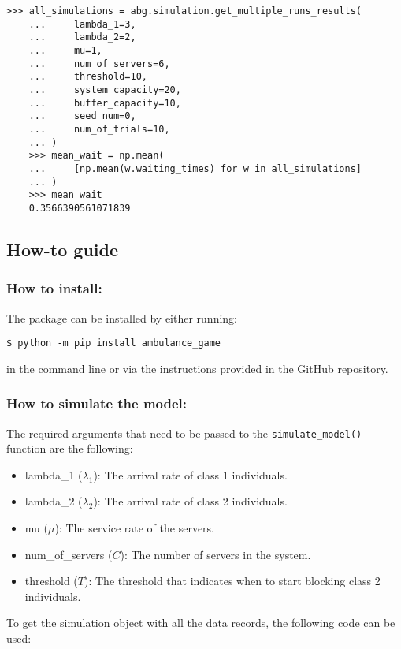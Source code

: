 \begin{lstlisting}[style=pystyle]
    >>> all_simulations = abg.simulation.get_multiple_runs_results(
    ...     lambda_1=3,
    ...     lambda_2=2,
    ...     mu=1,
    ...     num_of_servers=6,
    ...     threshold=10,
    ...     system_capacity=20,
    ...     buffer_capacity=10,
    ...     seed_num=0,
    ...     num_of_trials=10,
    ... )
    >>> mean_wait = np.mean(
    ...     [np.mean(w.waiting_times) for w in all_simulations]
    ... )
    >>> mean_wait
    0.3566390561071839

\end{lstlisting}


\subsection{How-to guide}

\subsubsection{How to install:}
The package can be installed by either running:

\begin{lstlisting}[style=terminalstyle]
    $ python -m pip install ambulance_game
\end{lstlisting}

in the command line or via the instructions provided in the GitHub repository.

\subsubsection{How to simulate the model:}
The required arguments that need to be passed to the 
\lstinline[style=pystyle]{simulate_model()} function
are the following:
\begin{itemize}
    \item lambda\_1 (\(\lambda_1\)): The arrival rate of class 1 individuals.
    \item lambda\_2 (\(\lambda_2\)): The arrival rate of class 2 individuals.
    \item mu (\(\mu\)): The service rate of the servers.
    \item num\_of\_servers (\(C\)): The number of servers in the system.
    \item threshold (\(T\)): The threshold that indicates when to start blocking 
    class 2 individuals.
\end{itemize}

To get the simulation object with all the data records, the following code can be
used:

